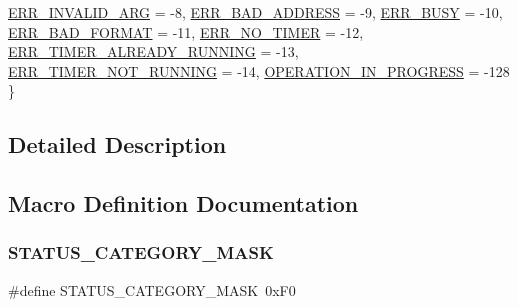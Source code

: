 \begin{DoxyCompactItemize}
\mbox{\hyperlink{group__group__sam0__utils__status__codes_gga29235ed38b6f02861f29daae665ac3a2a70aa759d292a0e4be7123d01959357da}{E\+R\+R\+\_\+\+I\+N\+V\+A\+L\+I\+D\+\_\+\+A\+RG}} = -\/8, 
\newline
\mbox{\hyperlink{group__group__sam0__utils__status__codes_gga29235ed38b6f02861f29daae665ac3a2ab7f7c844a2381a5b981a5e3d4a13ee17}{E\+R\+R\+\_\+\+B\+A\+D\+\_\+\+A\+D\+D\+R\+E\+SS}} = -\/9, 
\mbox{\hyperlink{group__group__sam0__utils__status__codes_gga29235ed38b6f02861f29daae665ac3a2a8d4f409eda53a10f049dc6d5a833ccba}{E\+R\+R\+\_\+\+B\+U\+SY}} = -\/10, 
\mbox{\hyperlink{group__group__sam0__utils__status__codes_gga29235ed38b6f02861f29daae665ac3a2aacb8e19f1a844f9dcef8448afaddc01f}{E\+R\+R\+\_\+\+B\+A\+D\+\_\+\+F\+O\+R\+M\+AT}} = -\/11, 
\mbox{\hyperlink{group__group__sam0__utils__status__codes_gga29235ed38b6f02861f29daae665ac3a2a6d0a40d6d1356ffebe4fc22ec41b267f}{E\+R\+R\+\_\+\+N\+O\+\_\+\+T\+I\+M\+ER}} = -\/12, 
\newline
\mbox{\hyperlink{group__group__sam0__utils__status__codes_gga29235ed38b6f02861f29daae665ac3a2affb72bf05bbe079b38c284796cf3e746}{E\+R\+R\+\_\+\+T\+I\+M\+E\+R\+\_\+\+A\+L\+R\+E\+A\+D\+Y\+\_\+\+R\+U\+N\+N\+I\+NG}} = -\/13, 
\mbox{\hyperlink{group__group__sam0__utils__status__codes_gga29235ed38b6f02861f29daae665ac3a2a2119391dfc2668780bfd41a25426c32d}{E\+R\+R\+\_\+\+T\+I\+M\+E\+R\+\_\+\+N\+O\+T\+\_\+\+R\+U\+N\+N\+I\+NG}} = -\/14, 
\mbox{\hyperlink{group__group__sam0__utils__status__codes_gga29235ed38b6f02861f29daae665ac3a2a9b25aed7ac4ef4fc3c7250543bb113c0}{O\+P\+E\+R\+A\+T\+I\+O\+N\+\_\+\+I\+N\+\_\+\+P\+R\+O\+G\+R\+E\+SS}} = -\/128
 \}
\end{DoxyCompactItemize}


\subsection{Detailed Description}


\subsection{Macro Definition Documentation}
\mbox{\label{group__group__sam0__utils__status__codes_ga5bf938a904077896054cd093bf7d8fa8}} 
\subsubsection{\texorpdfstring{STATUS\_CATEGORY\_MASK}{STATUS\_CATEGORY\_MASK}}
{\footnotesize\ttfamily \#define S\+T\+A\+T\+U\+S\+\_\+\+C\+A\+T\+E\+G\+O\+R\+Y\+\_\+\+M\+A\+SK~0x\+F0}

